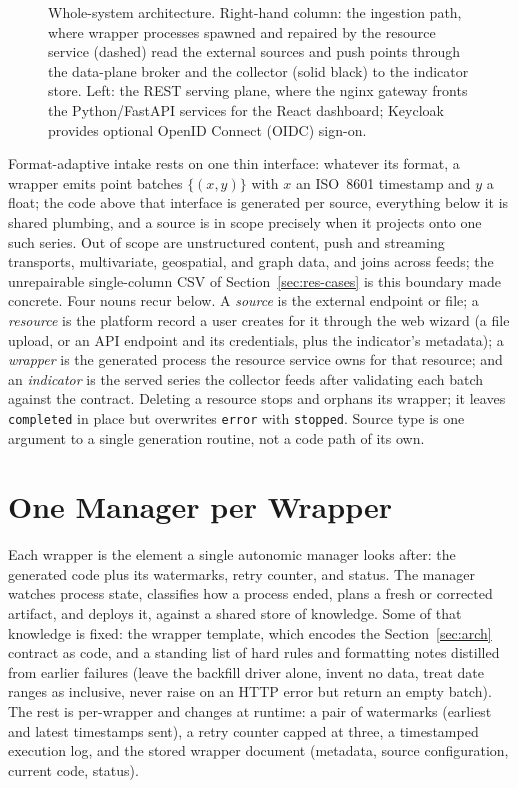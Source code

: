 \documentclass[conference]{IEEEtran}
\begin{document}
\begin{figure}[t]
\centering
\resizebox{0.76\columnwidth}{!}{}
\caption{Whole-system architecture. Right-hand column: the ingestion path, where
wrapper processes spawned and repaired by the resource service (dashed) read the
external sources and push points through the data-plane broker and the collector
(solid black) to the indicator store. Left: the REST serving plane, where the nginx
gateway fronts the Python/FastAPI services for the React dashboard; Keycloak provides
optional OpenID Connect (OIDC) sign-on.}
\label{fig:sysarch}
\end{figure}

Format-adaptive intake rests on one thin interface: whatever its format, a wrapper
emits point batches $\{(x,y)\}$ with $x$ an ISO~8601 timestamp and $y$ a float; the
code above that interface is generated per source, everything below it is shared
plumbing, and a source is in scope precisely when it projects onto one such series. Out of scope
are unstructured content, push and streaming transports, multivariate, geospatial,
and graph data, and joins across feeds; the unrepairable single-column CSV of Section~\ref{sec:res-cases} is this
boundary made concrete. Four nouns recur below. A \emph{source} is the external endpoint or file; a
\emph{resource} is the platform record a user creates for it through the web wizard
(a file upload, or an API endpoint and its credentials, plus the indicator's
metadata); a \emph{wrapper} is the generated process the resource service owns for
that resource; and an \emph{indicator} is the served series the collector feeds
after validating each batch against the contract. Deleting a resource stops and
orphans its wrapper; it leaves \texttt{completed} in place but overwrites
\texttt{error} with \texttt{stopped}. Source type is
one argument to a single generation routine, not a code path of its own.

\section{One Manager per Wrapper}
\label{sec:selfstar}

Each wrapper is the element a single autonomic manager looks after: the generated
code plus its watermarks, retry counter, and status. The manager watches process
state, classifies how a process ended, plans a fresh or corrected artifact, and
deploys it, against a shared store of knowledge. Some of that knowledge is fixed: the wrapper template, which encodes the
Section~\ref{sec:arch} contract as code, and a standing list of hard rules and formatting notes distilled from earlier
failures (leave the backfill driver alone, invent no data, treat date ranges as
inclusive, never raise on an HTTP error but return an empty batch). The rest is per-wrapper and changes at runtime: a pair of watermarks (earliest
and latest timestamps sent), a retry counter capped at three, a timestamped execution
log, and the stored wrapper document (metadata, source configuration, current code,
status).
\end{document}
